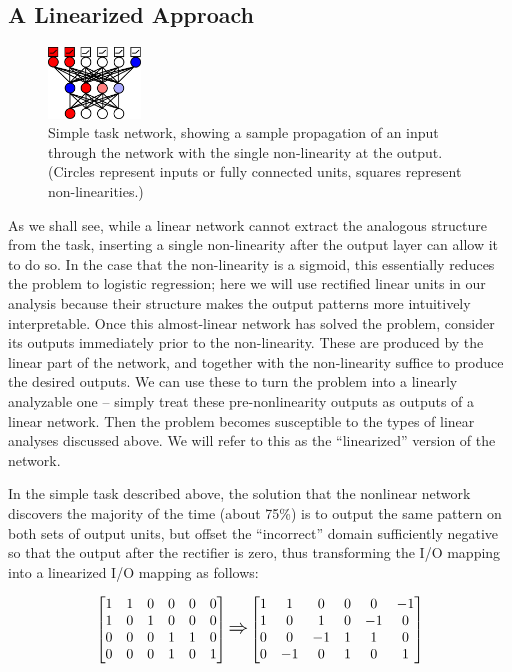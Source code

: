 \documentclass[10pt,letterpaper]{article}
\begin{document}
\subsection{A Linearized Approach}
\begin{figure}[p]
\centering
\includegraphics[width=0.22\textwidth]{figures/network_diagram.png}
\caption{Simple task network, showing a sample propagation of an input through the network with the single non-linearity at the output. (Circles represent inputs or fully connected units, squares represent non-linearities.) }
\label{network_diagram}
\end{figure}
As we shall see, while a linear network cannot extract the analogous structure from the task, inserting a single non-linearity after the output layer can allow it to do so. In the case that the non-linearity is a sigmoid, this essentially reduces the problem to logistic regression; here we will use rectified linear units in our analysis because their structure makes the output patterns more intuitively interpretable. Once this almost-linear network has solved the problem, consider its outputs immediately prior to the non-linearity. These are produced by the linear part of the network, and together with the non-linearity suffice to produce the desired outputs. We can use these to turn the problem into a linearly analyzable one -- simply treat these pre-nonlinearity outputs as outputs of a linear network. Then the problem becomes susceptible to the types of linear analyses discussed above. We will refer to this as the ``linearized'' version of the network. \par 
In the simple task described above, the solution that the nonlinear network discovers the majority of the time (about 75\%) is to output the same pattern on both sets of output units, but offset the ``incorrect'' domain sufficiently negative so that the output after the rectifier is zero, thus transforming the I/O mapping into a linearized I/O mapping as follows: \par
\vspace{-1em}
{ 
\[
\left[ \begin{matrix} 
1 & 1 & 0 & 0 & 0 & 0 \\
1 & 0 & 1 & 0 & 0 & 0 \\
 0 & 0 & 0 & 1 & 1 & 0\\
 0 & 0 & 0 & 1 & 0 & 1\\
\end{matrix}  \right] 
\mathlarger{\mathlarger{\Rightarrow}}
\left[ \begin{matrix} 
1 & 1 & 0 & 0 & 0 & -1 \\
1 & 0 & 1 & 0 & -1 & 0 \\
 0 & 0 & -1 & 1 & 1 & 0\\
 0 & -1 & 0 & 1 & 0 & 1\\
\end{matrix}  \right] 
\] }
\end{document}

